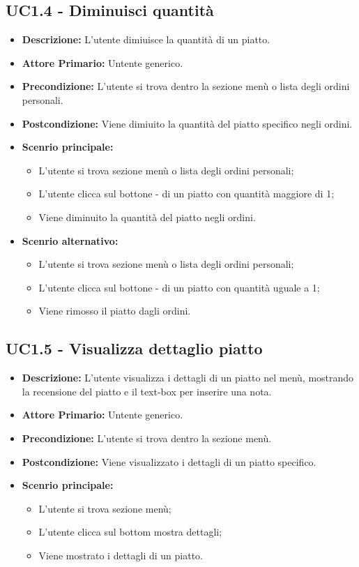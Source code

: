 \subsection{UC1.4 - Diminuisci quantità}
\begin{itemize}
    \item \textbf{Descrizione:} L'utente dimiuisce la quantità di un piatto.
    \item \textbf{Attore Primario:} Untente generico.
    \item \textbf{Precondizione:} L'utente si trova dentro la sezione menù o lista degli ordini personali.
    \item \textbf{Postcondizione:} Viene dimiuito la quantità del piatto specifico negli ordini.
    \item \textbf{Scenrio principale:}
    \begin{itemize}
        \item L'utente si trova sezione menù o lista degli ordini personali;
        \item L'utente clicca sul bottone - di un piatto con quantità maggiore di 1;
        \item Viene diminuito la quantità del piatto negli ordini.
    \end{itemize}
    \item \textbf{Scenrio alternativo:}
    \begin{itemize}
        \item L'utente si trova sezione menù o lista degli ordini personali;
        \item L'utente clicca sul bottone - di un piatto con quantità uguale a 1;
        \item Viene rimosso il piatto dagli ordini.
    \end{itemize}
\end{itemize}
\subsection{UC1.5 - Visualizza dettaglio piatto}
\begin{itemize}
    \item \textbf{Descrizione:} L'utente visualizza i dettagli di un piatto nel menù, mostrando la recensione del piatto e il text-box per inserire una nota.
    \item \textbf{Attore Primario:} Untente generico.
    \item \textbf{Precondizione:} L'utente si trova dentro la sezione menù.
    \item \textbf{Postcondizione:} Viene visualizzato i dettagli di un piatto specifico.
    \item \textbf{Scenrio principale:}  
    \begin{itemize}
        \item L'utente si trova sezione menù;
        \item L'utente clicca sul bottom mostra dettagli;
        \item Viene mostrato i dettagli di un piatto.
    \end{itemize}
\end{itemize}
